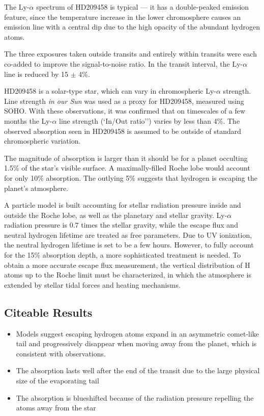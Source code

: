 \documentclass[onecolumn]{aastex63}
\begin{document}
The Ly-$\alpha$ spectrum of HD209458 is typical --- it has a double-peaked emission feature, since the temperature increase in the lower chromosphere causes an emission line with a central dip due to the high opacity of the abundant hydrogen atoms. 

The three exposures taken outside transits and entirely within transits were each co-added to improve the signal-to-noise ratio. In the transit interval, the Ly-$\alpha$ line is reduced by 15 $\pm$ 4\%. 

HD209458 is a solar-type star, which can vary in chromospheric Ly-$\alpha$ strength. Line strength \textit{in our Sun} was used as a proxy for HD209458, measured using SOHO. With these observations, it was confirmed that on timescales of a few months the Ly-$\alpha$ line strength (`In/Out ratio'') varies by less than 4\%. The observed absorption seen in HD209458 is assumed to be outside of standard chromospheric variation.

The magnitude of absorption is larger than it should be for a planet occulting 1.5\% of the star's visible surface. A maximally-filled Roche lobe would account for only 10\% absorption. The outlying 5\% suggests that hydrogen is escaping the planet's atmosphere. 

A particle model is built accounting for stellar radiation pressure inside and outside the Roche lobe, as well as the planetary and stellar gravity. Ly-$\alpha$ radiation pressure is 0.7 times the stellar gravity, while the escape flux and neutral hydrogen lifetime are treated as free parameters. Due to UV ionization, the neutral hydrogen lifetime is set to be a few hours. 
However, to fully account for the 15\% absorption depth, a more sophisticated treatment is needed. To obtain a more accurate escape flux measurement, the vertical distribution of H atoms up to the Roche limit must be characterized, in which the atmosphere is extended by stellar tidal forces and heating mechanisms. 

\subsection{Citeable Results}
\begin{itemize}
    \item Models suggest escaping hydrogen atoms expand in an asymmetric comet-like tail and progressively disappear when moving away from the planet, which is consistent with observations.
    \item The absorption lasts well after the end of the transit due to the large physical size of the evaporating tail
    \item The absorption is blueshifted because of the radiation pressure repelling the atoms away from the star
\end{itemize}
\end{document}
